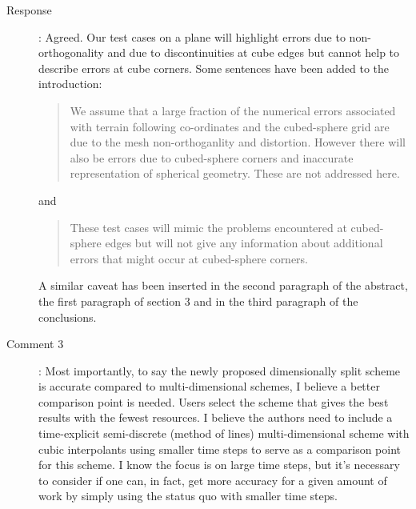 \documentclass[12pt]{article}
\begin{document}
\begin{description}
\item [Response]:
Agreed. Our test cases on a plane will highlight errors due to non-orthogonality and due to discontinuities at cube edges but cannot help to describe errors at cube corners. Some sentences have been added to the introduction:
\begin{quote}
We assume that a large fraction of the numerical errors associated with terrain following co-ordinates and the cubed-sphere grid are due to the mesh non-orthoganlity and distortion. However there will also be errors due to cubed-sphere corners and inaccurate representation of spherical geometry. These are not addressed here. 
\end{quote}
and
\begin{quote}
These test cases will mimic the problems encountered at cubed-sphere edges but will not give any information about additional errors that might occur at cubed-sphere corners. 
\end{quote}
A similar caveat has been inserted in the second paragraph of the abstract, the first paragraph of section 3 and in the third paragraph of the conclusions. 

\item [Comment 3]: Most importantly, to say the newly proposed dimensionally split scheme is accurate compared to multi-dimensional schemes, I believe a better comparison point is needed. Users select the scheme that gives the best results with the fewest resources. I believe the authors need to include a time-explicit semi-discrete (method of lines) multi-dimensional scheme with cubic interpolants using smaller time steps to serve as a comparison point for this scheme. I know the focus is on large time steps, but it's necessary to consider if one can, in fact, get more accuracy for a given amount of work by simply using the status quo with smaller time steps. 


\end{description}
\end{document}
